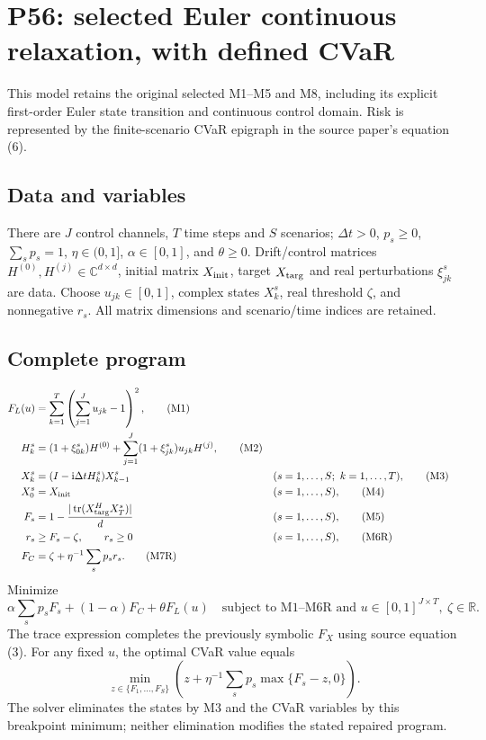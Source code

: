 \documentclass[11pt]{article}
\begin{document}
\section*{P56: selected Euler continuous relaxation, with defined CVaR}
This model retains the original selected M1--M5 and M8, including its explicit
first-order Euler state transition and continuous control domain. Risk is represented by the finite-scenario CVaR epigraph in the source paper's equation (6).

\subsection*{Data and variables}
There are $J$ control channels, $T$ time steps and $S$ scenarios; $\Delta t>0$,
$p_s\ge0$, $\sum_s p_s=1$, $\eta\in(0,1]$, $\alpha\in[0,1]$, and $\theta\ge0$.
Drift/control matrices $H^{(0)},H^{(j)}\in\mathbb C^{d\times d}$, initial matrix
$X_{\rm init}$, target $X_{\rm targ}$ and real perturbations $\xi_{jk}^s$ are data.
Choose $u_{jk}\in[0,1]$, complex states $X_k^s$, real threshold $\zeta$, and
nonnegative $r_s$. All matrix dimensions and scenario/time indices are retained.

\subsection*{Complete program}
\begin{align}
F_L(u)&=\sum_{k=1}^T\left(\sum_{j=1}^J u_{jk}-1\right)^2, \tag{M1}\\
H_k^s&=(1+\xi_{0k}^s)H^{(0)}
       +\sum_{j=1}^J(1+\xi_{jk}^s)u_{jk}H^{(j)}, \tag{M2}\\
X_k^s&=(I-\mathrm i\Delta t H_k^s)X_{k-1}^s
      &&(s=1,\ldots,S;\ k=1,\ldots,T), \tag{M3}\\
X_0^s&=X_{\rm init} &&(s=1,\ldots,S), \tag{M4}\\
F_s&=1-\frac{|\operatorname{tr}(X_{\rm targ}^H X_T^s)|}{d}
      &&(s=1,\ldots,S), \tag{M5}\\
r_s&\ge F_s-\zeta,\qquad r_s\ge0 &&(s=1,\ldots,S), \tag{M6R}\\
F_C&=\zeta+\eta^{-1}\sum_s p_sr_s. \tag{M7R}
\end{align}
Minimize
\[
 \alpha\sum_s p_sF_s+(1-\alpha)F_C+\theta F_L(u)
 \quad\text{subject to M1--M6R and }u\in[0,1]^{J\times T},\
 \zeta\in\mathbb R. \tag{M8}
\]
The trace expression completes the previously symbolic $F_X$ using source
equation (3). For any fixed $u$, the optimal CVaR value equals
\[
 \min_{z\in\{F_1,\ldots,F_S\}}
 \left(z+\eta^{-1}\sum_s p_s\max\{F_s-z,0\}\right).
\]
The solver eliminates the states by M3 and the CVaR variables by this breakpoint
minimum; neither elimination modifies the stated repaired program.
\end{document}
